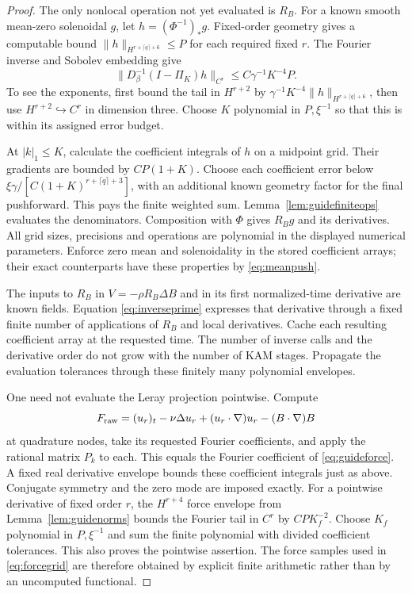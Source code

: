 \documentclass[11pt,a4paper]{amsart}
\theoremstyle{definition}
\theoremstyle{remark}
\numberwithin{equation}{section}
\newcommand{\norm}[1]{\lVert #1\rVert}
\newcommand{\push}[1]{(#1)_*}
\begin{document}
\begin{proof}
The only nonlocal operation not yet evaluated is $R_B$. For a known smooth mean-zero solenoidal $g$, let
$h=\push{\Phi^{-1}}g$. Fixed-order geometry gives a computable bound
$\norm h_{H^{r+\lceil q\rceil+6}}\le P$ for each required fixed $r$. The Fourier inverse and Sobolev embedding give
\begin{equation}\label{eq:inversecomputetail}
 \norm{D_\beta^{-1}(I-\Pi_K)h}_{C^r}
 \le C\gamma^{-1}K^{-4}P.
\end{equation}
To see the exponents, first bound the tail in $H^{r+2}$ by
$\gamma^{-1}K^{-4}\norm h_{H^{r+\lceil q\rceil+6}}$, then use
$H^{r+2}\hookrightarrow C^r$ in dimension three. Choose $K$ polynomial in $P,\xi^{-1}$ so that this is within its assigned error budget.

At $|k|_1\le K$, calculate the coefficient integrals of $h$ on a midpoint grid. Their gradients are bounded by $CP(1+K)$. Choose each coefficient error below
$\xi\gamma/[C(1+K)^{r+\lceil q\rceil+3}]$, with an additional known geometry factor for the final pushforward. This pays the finite weighted sum. Lemma~\ref{lem:guidefiniteops} evaluates the denominators. Composition with $\Phi$ gives $R_Bg$ and its derivatives. All grid sizes, precisions and operations are polynomial in the displayed numerical parameters. Enforce zero mean and solenoidality in the stored coefficient arrays; their exact counterparts have these properties by \eqref{eq:meanpush}.

The inputs to $R_B$ in $V=-\rho R_B\Delta B$ and in its first normalized-time derivative are known fields. Equation \eqref{eq:inverseprime} expresses that derivative through a fixed finite number of applications of $R_B$ and local derivatives. Cache each resulting coefficient array at the requested time. The number of inverse calls and the derivative order do not grow with the number of KAM stages. Propagate the evaluation tolerances through these finitely many polynomial envelopes.

One need not evaluate the Leray projection pointwise. Compute
\[
 F_{\rm raw}=(u_r)_t-\nu\Delta u_r
                   +(u_r\cdot\nabla)u_r-(B\cdot\nabla)B
\]
at quadrature nodes, take its requested Fourier coefficients, and apply the rational matrix $P_k$ to each. This equals the Fourier coefficient of \eqref{eq:guideforce}. A fixed real derivative envelope bounds these coefficient integrals just as above. Conjugate symmetry and the zero mode are imposed exactly. For a pointwise derivative of fixed order $r$, the $H^{r+4}$ force envelope from Lemma~\ref{lem:guidenorms} bounds the Fourier tail in $C^r$ by $CPK_f^{-2}$. Choose $K_f$ polynomial in $P,\xi^{-1}$ and sum the finite polynomial with divided coefficient tolerances. This also proves the pointwise assertion. The force samples used in \eqref{eq:forcegrid} are therefore obtained by explicit finite arithmetic rather than by an uncomputed functional.
\end{proof}
\end{document}
